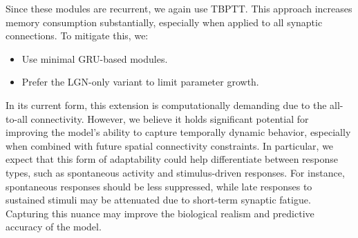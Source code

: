 Since these modules are recurrent, we again use TBPTT. This approach increases memory consumption substantially, especially when applied to all synaptic connections. To mitigate this, we:
\begin{itemize}
    \item Use minimal GRU-based modules.
    \item Prefer the LGN-only variant to limit parameter growth.
\end{itemize}

In its current form, this extension is computationally demanding due to the all-to-all connectivity. However, we believe it holds significant potential for improving the model's ability to capture temporally dynamic behavior, especially when combined with future spatial connectivity constraints. In particular, we expect that this form of adaptability could help differentiate between response types, such as spontaneous activity and stimulus-driven responses. For instance, spontaneous responses should be less suppressed, while late responses to sustained stimuli may be attenuated due to short-term synaptic fatigue. Capturing this nuance may improve the biological realism and predictive accuracy of the model.

